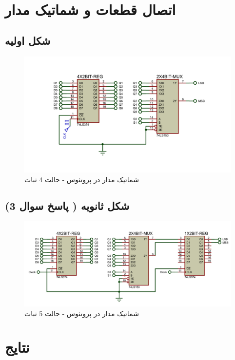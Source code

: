\documentclass[a4paper,12pt]{article}
\begin{document}
\pagebreak
\section{اتصال قطعات و شماتیک مدار}
\subsection{شکل اولیه}
\begin{figure}[H]
    \centering
    \includegraphics[width=1\textwidth]{images/schematic.pdf}
    \caption{شماتیک مدار در پروتئوس - حالت 4 ثبات}
    \label{fig:schematic}
\end{figure}

\subsection{شکل ثانویه ( پاسخ سوال 3)}
\begin{figure}[H]
    \centering
    \includegraphics[width=1\textwidth]{images/schematic_with_E.pdf}
    \caption{شماتیک مدار در پروتئوس - حالت 5 ثبات}
    \label{fig:schematic}
\end{figure}


\pagebreak
\section{نتایج}
\end{document}
